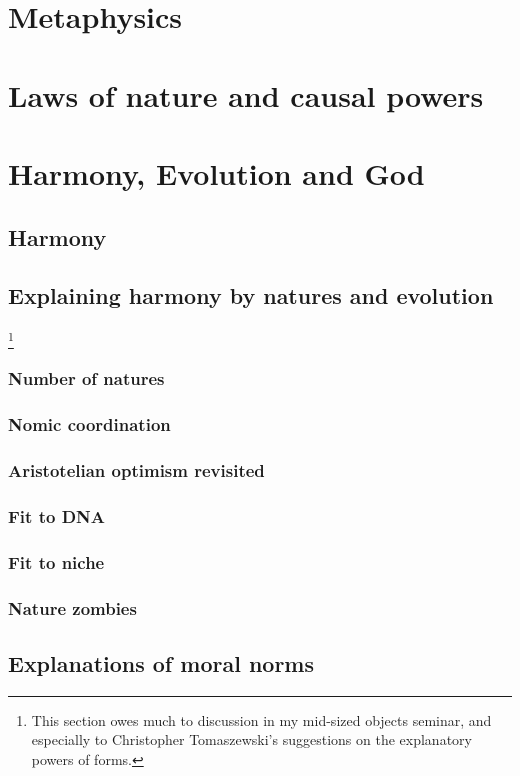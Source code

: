 \def\mychapter{VII}

\chapter{Metaphysics}\label{ch:metaphysics}
\chaptertail 

\def\mychapter{VIII}

\chapter{Laws of nature and causal powers}\label{ch:laws}
\chaptertail

\def\mychapter{IX}

\chapter{Harmony, Evolution and God}\label{ch:God}
\section{Harmony}
\section{Explaining harmony by natures and evolution}
\footnote{This section owes much to discussion in my mid-sized objects seminar, and especially to Christopher Tomaszewski's suggestions on the explanatory powers of forms.}
\subsection{Number of natures}
\subsection{Nomic coordination}
\subsection{Aristotelian optimism revisited}
\subsection{Fit to DNA}
\subsection{Fit to niche}
\subsection{Nature zombies}
\section{Explanations of moral norms}
